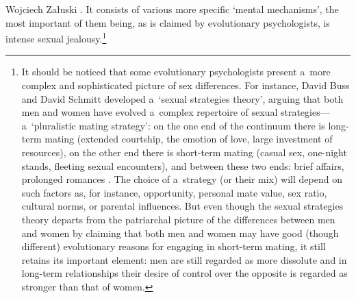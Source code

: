 \begin{artengenv}{Wojciech Załuski}
\parencite[cf.][]{wilson_man_1992}. %
 It consists of various more specific ‘mental mechanisms', the most important of them being, as is claimed by evolutionary psychologists, is intense sexual jealousy.\footnote{It should be noticed that some evolutionary psychologists present a~more complex and sophisticated picture of sex differences. For instance, David Buss and David Schmitt 
\parencites[cf.][]{crawford_psychology_1998}[][]{schmitt_fundamentals_2015}[][]{buss_evolutionary_2011} %
 developed a~‘sexual strategies theory', arguing that both men and women have evolved a~complex repertoire of sexual strategies---a~‘pluralistic mating strategy': on the one end of the continuum there is long-term mating (extended courtship, the emotion of love, large investment of resources), on the other end there is short-term mating (casual sex, one-night stands, fleeting sexual encounters), and between these two ends: brief affairs, prolonged romances 
\parencite[cf.][pp.207--271]{schmitt_fundamentals_2015}. %
 The choice of a~strategy (or their mix) will depend on such factors as, for instance, opportunity, personal mate value, sex ratio, cultural norms, or parental influences. But even though the sexual strategies theory departs from the patriarchal picture of the differences between men and women by claiming that both men and women may have good (though different) evolutionary reasons for engaging in short-term mating, it still retains its important element: men are still regarded as more dissolute and in long-term relationships their desire of control over the opposite is regarded as stronger than that of women.}


\end{artengenv}
